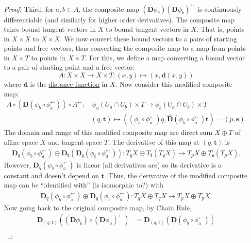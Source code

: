 \documentclass[letterpaper,12pt]{article}
\theoremstyle{plain}
\theoremstyle{plain}
\theoremstyle{definition}
\begin{document}
\begin{proof}
\noindent Third, for $a,b\in A$, the composite map $(\mathbf{D}\phi_b)(\mathbf{D}\phi_b)^{\leftarrow}$ is continuously differentiable (and similarly for higher order derivatives). The composite map takes bound tangent vectors in $X$ to bound tangent vectors in $X$. That is, points in $X \times X$ to $X \times X$. We now convert these bound vectors to a pairs of starting points and free vectors, thus converting the composite map to a map from points in $X \times T$ to points in $X \times T$. For this, we define a map converting a bound vector to a pair of starting point and a free vector:
\[ A:X \times X \rightarrow X \times T:(x,y)\mapsto \left(x,\mathbf{d}(x,y)\right)\]
where $\mathbf{d}$ is the \hyperref[defafsp]{distance function} in $X$. Now consider this modified composite map:
\begin{align*}
A\circ \left(\mathbf{D}\left(\phi_b\circ\phi_a^{\leftarrow}\right)\right)\circ A^{\leftarrow}:&\, \phi_a(U_a\cap U_b) \times T \rightarrow \phi_b(U_a\cap U_b) \times T \\
&(q,\mathbf{t})\mapsto \left( \left( \phi_b \circ \phi_a^{\leftarrow} \right) q, \hat{\mathbf{D}}\left( \phi_b \circ \phi_a^{\leftarrow} \right) \mathbf{t} \right) = (p,\mathbf{s}).
\end{align*}
The domain and range of this modified composite map are direct sum \citep[see][p. 180]{Dodson/Poston:1991} $X \oplus T$\index{$\oplus$} of affine space $X$ and tangent space $T$. The derivative of this map at $(q,\mathbf{t})$ is
\begin{align*}
\mathbf{D}_q\left( \phi_b \circ \phi_a^{\leftarrow} \right) \oplus \mathbf{D}_{\mathbf{t}}\left( \mathbf{D}_q\left( \phi_b \circ \phi_a^{\leftarrow}\right)\right): T_qX \oplus T_{\mathbf{t}}\left( T_qX\right) \rightarrow T_pX \oplus T_{\mathbf{s}}\left( T_pX\right).
\end{align*}
However, $\mathbf{D}_q\left( \phi_b \circ \phi_a^{\leftarrow}\right)$ is linear (all derivatives are) so its derivative is a constant and doesn't depend on $\mathbf{t}$. Thus, the derivative of the modified composite map can be ``identified with'' (is isomorphic to?) with
\begin{align*}
\mathbf{D}_q\left( \phi_b \circ \phi_a^{\leftarrow} \right) \oplus \mathbf{D}_q\left( \phi_b \circ \phi_a^{\leftarrow}\right): T_qX \oplus T_qX \rightarrow T_pX \oplus  T_pX.
\end{align*}
Now going back to the original composite map, by Chain Rule,
\begin{align*}
\mathbf{D}_{(q,\mathbf{t})}\left( (\mathbf{D}\phi_b) \circ \left( \mathbf{D}\phi_a \right)^{\leftarrow} \right) &= \mathbf{D}_{(q,\mathbf{t})}\left( \mathbf{D}(\phi_b\circ\phi_a^{\leftarrow} )\right) \\

\end{align*}
\end{proof}
\end{document}

